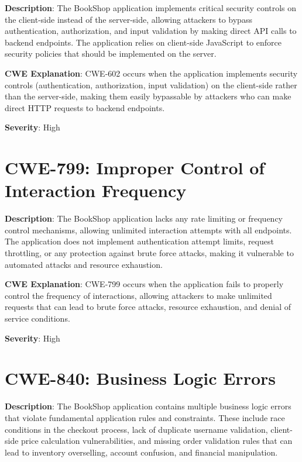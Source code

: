 \documentclass[]{UCD_CS_FYP_Report}
\begin{document}
\textbf{Description}: The BookShop application implements critical security controls on the client-side instead of the server-side, allowing attackers to bypass authentication, authorization, and input validation by making direct API calls to backend endpoints. The application relies on client-side JavaScript to enforce security policies that should be implemented on the server.

\textbf{CWE Explanation}: CWE-602 occurs when the application implements security controls (authentication, authorization, input validation) on the client-side rather than the server-side, making them easily bypassable by attackers who can make direct HTTP requests to backend endpoints.

\textbf{Severity}: High



\section{CWE-799: Improper Control of Interaction Frequency}

\textbf{Description}: The BookShop application lacks any rate limiting or frequency control mechanisms, allowing unlimited interaction attempts with all endpoints. The application does not implement authentication attempt limits, request throttling, or any protection against brute force attacks, making it vulnerable to automated attacks and resource exhaustion.

\textbf{CWE Explanation}: CWE-799 occurs when the application fails to properly control the frequency of interactions, allowing attackers to make unlimited requests that can lead to brute force attacks, resource exhaustion, and denial of service conditions.

\textbf{Severity}: High



\section{CWE-840: Business Logic Errors}

\textbf{Description}: The BookShop application contains multiple business logic errors that violate fundamental application rules and constraints. These include race conditions in the checkout process, lack of duplicate username validation, client-side price calculation vulnerabilities, and missing order validation rules that can lead to inventory overselling, account confusion, and financial manipulation.
\end{document}
